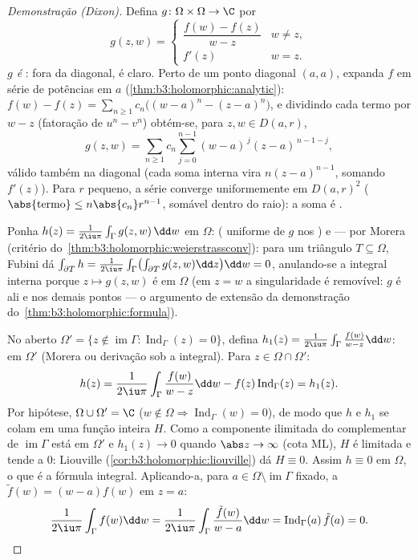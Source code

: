 \begin{proof}[Demonstração (Dixon)]
Defina $g \colon \Omega\times\Omega \to \C$ por
\[
g(z, w) = \begin{cases}
\dfrac{f(w) - f(z)}{w - z} & w \neq z,\\[4pt]
f'(z) & w = z .
\end{cases}
\]
\emph{$g$ é }: fora da diagonal, é claro. Perto de um ponto
diagonal $(a, a)$, expanda $f$ em série de potências em $a$
(\cref{thm:b3:holomorphic:analytic}): $f(w) - f(z) =
\sum_{n\geq1}c_n\bigl((w-a)^n - (z-a)^n\bigr)$, e dividindo cada termo por $w - z$ (fatoração
de $u^n - v^n$) obtém-se, para $z, w \in D(a, r)$,
\[
g(z, w) =
\sum_{n\geq1}c_n\sum_{j=0}^{n-1}(w-a)^{\,j}(z-a)^{\,n-1-j},
\]
válido também na diagonal (cada soma interna vira $n(z-a)^{n-1}$, somando
$f'(z)$). Para $r$ pequeno, a série converge uniformemente em $D(a,r)^2$
($\abs{\text{termo}} \leq n\abs{c_n}r^{n-1}$, somável dentro do raio): a soma é .

Ponha $h(z) = \frac1{2\iu\pi}\int_\Gamma g(z, w)\,\dd w$ em $\Omega$:  ( uniforme de $g$ nos
) e  --- por Morera (critério do~\cref{thm:b3:holomorphic:weierstrassconv}): para
um triângulo $T \subseteq \Omega$, Fubini dá $\int_{\partial
T}h = \frac1{2\iu\pi}\int_\Gamma\bigl(\int_{\partial T}g(z,
w)\dd z\bigr)\dd w = 0$, anulando-se a integral interna porque
$z \mapsto g(z, w)$ é  em $\Omega$ (em $z = w$ a singularidade é
removível: $g$ é ali  e  nos demais pontos --- o
argumento de extensão da demonstração do~\cref{thm:b3:holomorphic:formula}).

No aberto $\Omega' = \{z \notin \operatorname{im}\Gamma
: \operatorname{Ind}_\Gamma(z) = 0\}$, defina $h_1(z) =
\frac1{2\iu\pi}\int_\Gamma\frac{f(w)}{w - z}\dd w$:  em $\Omega'$ (Morera ou derivação sob
a integral). Para $z \in \Omega\cap\Omega'$:
\[
h(z) = \frac1{2\iu\pi}\int_\Gamma\frac{f(w)}{w-z}\dd w
- f(z)\operatorname{Ind}_\Gamma(z) = h_1(z) .
\]
Por hipótese, $\Omega\cup\Omega' = \C$ ($w \notin \Omega
\Rightarrow \operatorname{Ind}_\Gamma(w) = 0$), de modo que $h$ e $h_1$ se colam em uma
função inteira $H$. Como a componente ilimitada do complementar de
$\operatorname{im}\Gamma$ está em $\Omega'$ e $h_1(z) \to 0$ quando $\abs z \to \infty$ (cota ML), $H$ é limitada e
tende a $0$: Liouville (\cref{cor:b3:holomorphic:liouville}) dá $H \equiv 0$. Assim $h \equiv 0$ em
$\Omega$, o que é a fórmula integral. Aplicando-a, para $a \in
\Omega\setminus\operatorname{im}\Gamma$ fixado,
a $\tilde f(w) =
(w - a)f(w)$ em $z = a$:
\[
\frac1{2\iu\pi}\int_\Gamma f(w)\dd w =
\frac1{2\iu\pi}\int_\Gamma \frac{\tilde f(w)}{w - a}\dd w =
\operatorname{Ind}_\Gamma(a)\,\tilde f(a) = 0 .
\]
\end{proof}

